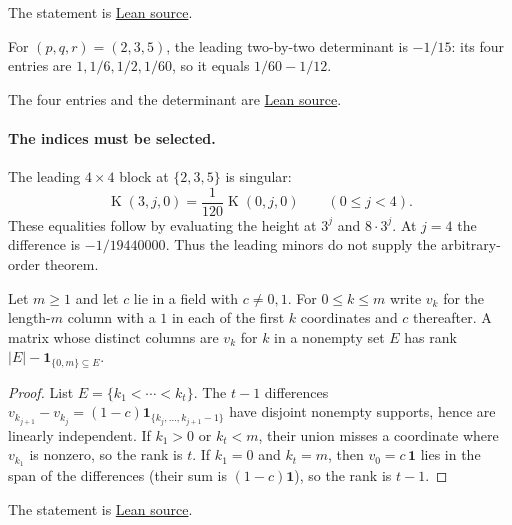 \documentclass[11pt]{article}
\newcommand{\Kernel}{\operatorname{K}}
\begin{document}
\noindent The statement is \href{https://github.com/wcook04/plectis-erdos/blob/f36a98bf3d3e6f65f1074e3b800e3293d5b8a51a/ErdosProblems/Erdos269/PaperR7ModularMinors.lean#L133}{Lean source}.



\begin{example}\label{res:rank}
For $(p,q,r)=(2,3,5)$, the leading two-by-two determinant is $-1/15$:
its four entries are $1,1/6,1/2,1/60$, so it equals $1/60-1/12$.
\end{example}

\noindent The four entries and the determinant are
\href{https://github.com/wcook04/plectis-erdos/blob/f36a98bf3d3e6f65f1074e3b800e3293d5b8a51a/ErdosProblems/Erdos269/PaperR7BasicAssembly.lean#L102}{Lean source}.

\paragraph{The indices must be selected.}
The leading $4\times4$ block at $\{2,3,5\}$ is singular:
\[
 \Kernel(3,j,0)=\frac1{120}\Kernel(0,j,0)\qquad(0\le j<4).
\]
These equalities follow by evaluating the height at $3^j$ and $8\cdot3^j$.
At $j=4$ the difference is $-1/19440000$.
Thus the leading minors do not supply the arbitrary-order theorem.


\begin{proposition}\label{res:finite-cut-rank}
Let $m\ge1$ and let $c$ lie in a field with $c\ne 0,1$.
For $0\le k\le m$ write $v_k$ for the length-$m$ column with a $1$ in each of
the first $k$ coordinates and $c$ thereafter.
A matrix whose distinct columns are $v_k$ for $k$ in a nonempty set $E$ has
rank $|E|-\mathbf 1_{\{0,m\}\subseteq E}$.
\end{proposition}

\begin{proof}
List $E=\{k_1<\cdots<k_t\}$.  The $t-1$ differences
$v_{k_{j+1}}-v_{k_j}=(1-c)\mathbf 1_{\{k_j,\ldots,k_{j+1}-1\}}$
have disjoint nonempty supports, hence are linearly independent.
If $k_1>0$ or $k_t<m$, their union misses a coordinate where $v_{k_1}$ is
nonzero, so the rank is $t$.
If $k_1=0$ and $k_t=m$, then $v_0=c\,\mathbf 1$ lies in the span of the
differences (their sum is $(1-c)\mathbf 1$), so the rank is $t-1$.
\end{proof}

\noindent The statement is \href{https://github.com/wcook04/plectis-erdos/blob/f36a98bf3d3e6f65f1074e3b800e3293d5b8a51a/ErdosProblems/Erdos269/PaperR7FiniteCutRank.lean#L182}{Lean source}.
\end{document}
